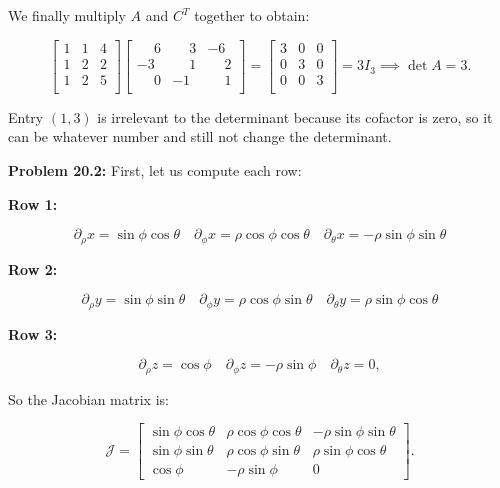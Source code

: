 \documentclass{article}
\begin{document}
We finally multiply $A$ and $C^{T}$ together to obtain:

\[
\begin{bmatrix}
1 & 1 & 4\\
1 & 2 & 2\\
1 & 2 & 5\\
\end{bmatrix}
\begin{bmatrix}
\phantom{-}6 & \phantom{-}3 & -6\\
-3 & \phantom{-}1 & \phantom{-}2\\
\phantom{-}0 & -1 & \phantom{-}1\\
\end{bmatrix}
=
\begin{bmatrix}
3 & 0 & 0\\
0 & 3 & 0\\
0 & 0 & 3\\
\end{bmatrix}
=
3I_3 \implies \det A = 3.
\]

Entry $(1, 3)$ is irrelevant to the determinant because its cofactor is zero, so it can be whatever number and still not change the determinant.

\newpage

\noindent \textbf{Problem 20.2:} First, let us compute each row:

\noindent \textbf{Row 1:}

\[
\partial_{\rho}x = \sin \phi \cos \theta \quad \partial_{\phi}x = \rho \cos \phi \cos \theta \quad \partial_{\theta}x = -\rho \sin \phi \sin \theta
\]

\noindent \textbf{Row 2:}

\[
\partial_{\rho}y = \sin \phi \sin \theta \quad \partial_{\phi}y = \rho \cos \phi \sin \theta \quad \partial_{\theta}y = \rho \sin \phi \cos \theta
\]

\noindent \textbf{Row 3:}

\[
\partial_{\rho}z = \cos \phi \quad \partial_{\phi}z = -\rho \sin \phi \quad \partial_{\theta}z = 0,
\]

So the Jacobian matrix is:

\[
\mathcal{J} = \begin{bmatrix}
\sin \phi \cos \theta & \rho \cos \phi \cos \theta & -\rho \sin \phi \sin \theta\\
\sin \phi \sin \theta & \rho \cos \phi \sin \theta & \rho \sin \phi \cos \theta\\
\cos \phi & -\rho \sin \phi & 0
\end{bmatrix}.
\]
\end{document}
